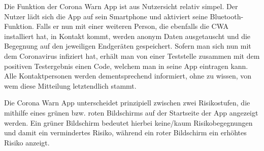 \documentclass[conference]{IEEEtran}
\begin{document}
Die Funktion der Corona Warn App ist aus Nutzersicht relativ simpel. Der Nutzer lädt sich die App auf sein Smartphone und aktiviert seine Bluetooth-Funktion. 
Falls er nun mit einer weiteren Person, die ebenfalls die CWA installiert hat, in Kontakt kommt, werden anonym Daten ausgetauscht und die Begegnung auf den jeweiligen Endgeräten gespeichert. 
Sofern man sich nun mit dem Coronavirus infiziert hat, erhält man von einer Teststelle zusammen mit dem positiven Testergebnis einen Code, welchem man in seine App eintragen kann. 
Alle Kontaktpersonen werden dementsprechend informiert, ohne zu wissen, von wem diese Mitteilung letztendlich stammt. 

Die Corona Warn App unterscheidet prinzipiell zwischen zwei Risikostufen, die mithilfe eines grünen bzw. roten Bildschirms auf der Startseite der App angezeigt werden. 
Ein grüner Bildschirm bedeutet hierbei keine/kaum Risikobegegnungen und damit ein vermindertes Risiko, während ein roter Bildschirm ein erhöhtes Risiko anzeigt.
\end{document}
